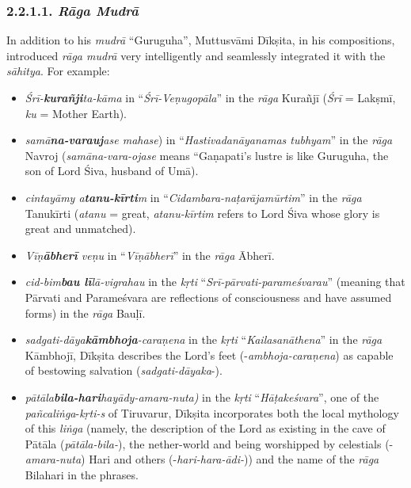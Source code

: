 \subsubsection*{2.2.1.1. \textit{Rāga Mudrā}}

In addition to his \textit{mudrā} “Guruguha”, Muttusvāmi Dīkṣita, in his compositions, introduced \textit{rāga mudrā} very intelligently and seamlessly integrated it with the \textit{sāhitya}. For example:

\begin{itemize}
\itemsep=0pt

 \item \textit{Śrī-\textbf{kurañji}ta-kāma} in “\textit{Śrī-Veṇugopāla}” in the \textit{rāga} Kurañjī (\textit{Śrī} = Lakṣmī, \textit{ku} = Mother Earth).

 \item \textit{samā\textbf{na-varauj}ase mahase}) in “\textit{Hastivadanāyanamas tubhyam}” in the \textit{rāga} Navroj (\textit{samāna-vara-ojase} means “Gaṇapati’s lustre is like Guruguha, the son of Lord Śiva, husband of Umā).

 \item \textit{cintayāmy a\textbf{tanu-kīrti}m} in “\textit{Cidambara-naṭarājamūrtim}” in the \textit{rāga} Tanukīrti (\textit{atanu} = great, \textit{atanu-kīrtim} refers to Lord Śiva whose glory is great and unmatched).

 \item \textit{Vīṇ\textbf{ābherī} veṇu} in “\textit{Vīṇābherī}” in the \textit{rāga} Ābherī.

 \item \textit{cid-bim\textbf{bau lī}lā-vigrahau} in the \textit{kṛti} “\textit{Srī-pārvati-parameśvarau}” (meaning that Pārvati and Parameśvara are reflections of consciousness and have assumed forms) in the \textit{rāga} Bauḷī.

 \item \textit{sadgati-dāya\textbf{kāmbhoja}-caraṇena} in the \textit{kṛti} “\textit{Kailasanāthena}” in the \textit{rāga} Kāmbhojī, Dīkṣita describes the Lord’s feet (-\textit{ambhoja-caraṇena}) as capable of bestowing salvation (\textit{sadgati-dāyaka}-).

 \item \textit{pātāla\textbf{bila-hari}hayādy-amara-nuta)} in the \textit{kṛti} “\textit{Hāṭakeśvara}”, one of the \textit{pañcaliṅga}-\textit{kṛti-s} of Tiruvarur, Dīkṣita incorporates both the local mythology of this \textit{liṅga} (namely, the description of the Lord as existing in the cave of Pātāla (\textit{pātāla-bila-}), the nether-world and being worshipped by celestials (-\textit{amara-nuta}) Hari and others (-\textit{hari-hara-ādi-})) and the name of the \textit{rāga} Bilahari in the phrases.


\end{itemize}
